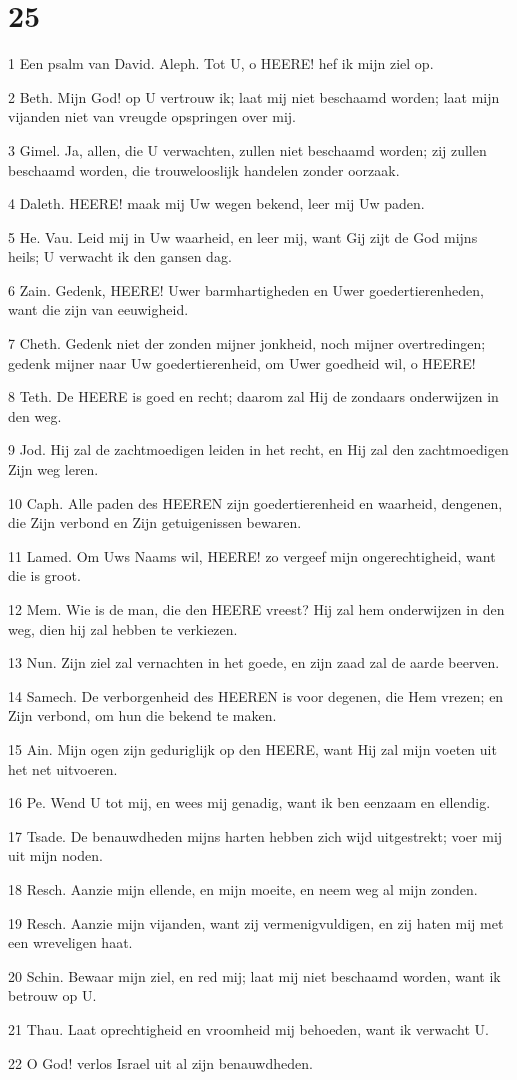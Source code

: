 \chapter{25}

\par 1 Een psalm van David. Aleph. Tot U, o HEERE! hef ik mijn ziel op.
\par 2 Beth. Mijn God! op U vertrouw ik; laat mij niet beschaamd worden; laat mijn vijanden niet van vreugde opspringen over mij.
\par 3 Gimel. Ja, allen, die U verwachten, zullen niet beschaamd worden; zij zullen beschaamd worden, die trouwelooslijk handelen zonder oorzaak.
\par 4 Daleth. HEERE! maak mij Uw wegen bekend, leer mij Uw paden.
\par 5 He. Vau. Leid mij in Uw waarheid, en leer mij, want Gij zijt de God mijns heils; U verwacht ik den gansen dag.
\par 6 Zain. Gedenk, HEERE! Uwer barmhartigheden en Uwer goedertierenheden, want die zijn van eeuwigheid.
\par 7 Cheth. Gedenk niet der zonden mijner jonkheid, noch mijner overtredingen; gedenk mijner naar Uw goedertierenheid, om Uwer goedheid wil, o HEERE!
\par 8 Teth. De HEERE is goed en recht; daarom zal Hij de zondaars onderwijzen in den weg.
\par 9 Jod. Hij zal de zachtmoedigen leiden in het recht, en Hij zal den zachtmoedigen Zijn weg leren.
\par 10 Caph. Alle paden des HEEREN zijn goedertierenheid en waarheid, dengenen, die Zijn verbond en Zijn getuigenissen bewaren.
\par 11 Lamed. Om Uws Naams wil, HEERE! zo vergeef mijn ongerechtigheid, want die is groot.
\par 12 Mem. Wie is de man, die den HEERE vreest? Hij zal hem onderwijzen in den weg, dien hij zal hebben te verkiezen.
\par 13 Nun. Zijn ziel zal vernachten in het goede, en zijn zaad zal de aarde beerven.
\par 14 Samech. De verborgenheid des HEEREN is voor degenen, die Hem vrezen; en Zijn verbond, om hun die bekend te maken.
\par 15 Ain. Mijn ogen zijn geduriglijk op den HEERE, want Hij zal mijn voeten uit het net uitvoeren.
\par 16 Pe. Wend U tot mij, en wees mij genadig, want ik ben eenzaam en ellendig.
\par 17 Tsade. De benauwdheden mijns harten hebben zich wijd uitgestrekt; voer mij uit mijn noden.
\par 18 Resch. Aanzie mijn ellende, en mijn moeite, en neem weg al mijn zonden.
\par 19 Resch. Aanzie mijn vijanden, want zij vermenigvuldigen, en zij haten mij met een wreveligen haat.
\par 20 Schin. Bewaar mijn ziel, en red mij; laat mij niet beschaamd worden, want ik betrouw op U.
\par 21 Thau. Laat oprechtigheid en vroomheid mij behoeden, want ik verwacht U.
\par 22 O God! verlos Israel uit al zijn benauwdheden.


